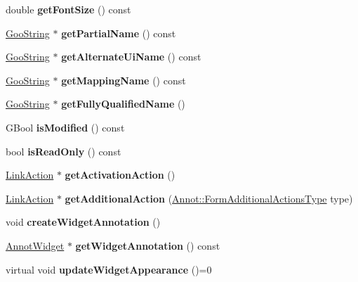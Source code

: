 \begin{DoxyCompactItemize}
\item 
\mbox{\label{class_form_widget_a7c30207ae0bf949a80b15fe8141e1b45}} 
double {\bfseries get\+Font\+Size} () const
\item 
\mbox{\label{class_form_widget_a93eadb7a69bf935b9ef5aaccf67bf0c3}} 
\hyperlink{class_goo_string}{Goo\+String} $\ast$ {\bfseries get\+Partial\+Name} () const
\item 
\mbox{\label{class_form_widget_a638c8e64158a97cbba631ef1d0eab3a6}} 
\hyperlink{class_goo_string}{Goo\+String} $\ast$ {\bfseries get\+Alternate\+Ui\+Name} () const
\item 
\mbox{\label{class_form_widget_a5afe026c799a3c3f567a3cbcdd099d5b}} 
\hyperlink{class_goo_string}{Goo\+String} $\ast$ {\bfseries get\+Mapping\+Name} () const
\item 
\mbox{\label{class_form_widget_a9a793f9aa7f7e6e367870a24f102b80d}} 
\hyperlink{class_goo_string}{Goo\+String} $\ast$ {\bfseries get\+Fully\+Qualified\+Name} ()
\item 
\mbox{\label{class_form_widget_a293b4ba8363a94e83ea70d072520bdcb}} 
G\+Bool {\bfseries is\+Modified} () const
\item 
\mbox{\label{class_form_widget_a0829e8a5c3e47536acebc6ed993f63ae}} 
bool {\bfseries is\+Read\+Only} () const
\item 
\mbox{\label{class_form_widget_a0c90fb490b2779d6f36a3a967e56870f}} 
\hyperlink{class_link_action}{Link\+Action} $\ast$ {\bfseries get\+Activation\+Action} ()
\item 
\mbox{\label{class_form_widget_a8a8a8051dbfa9699ce63c2a8f9d96b57}} 
\hyperlink{class_link_action}{Link\+Action} $\ast$ {\bfseries get\+Additional\+Action} (\hyperlink{class_annot_abf107d3384b67dc4314bc477195077e3}{Annot\+::\+Form\+Additional\+Actions\+Type} type)
\item 
\mbox{\label{class_form_widget_a27c07f45d337915b32510bcf383b09b4}} 
void {\bfseries create\+Widget\+Annotation} ()
\item 
\mbox{\label{class_form_widget_a21cad3c9d3e0ab7c509d640d993160db}} 
\hyperlink{class_annot_widget}{Annot\+Widget} $\ast$ {\bfseries get\+Widget\+Annotation} () const
\item 
\mbox{\label{class_form_widget_a2049279cccce5d0636021ef6725b84ae}} 
virtual void {\bfseries update\+Widget\+Appearance} ()=0
\end{DoxyCompactItemize}
